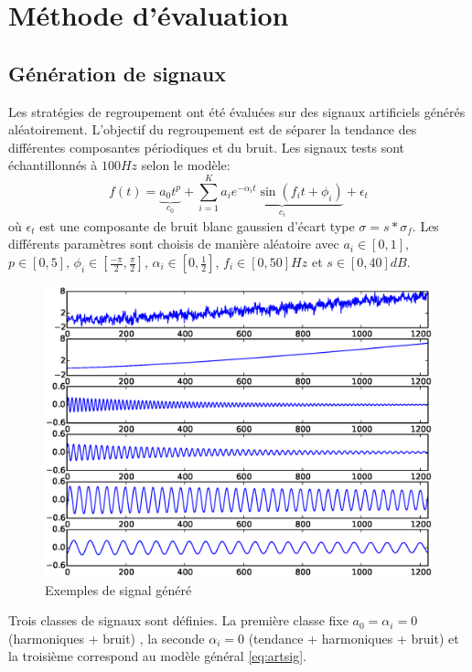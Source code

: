 \documentclass{gretsi}
\newcommand{\inter}{\left[0, 1\right]}
\begin{document}

\section{Méthode d'évaluation}
\label{sec:eval}

\subsection{Génération de signaux}
\label{sub:artsig}

    Les stratégies de regroupement ont été évaluées sur des signaux artificiels générés aléatoirement.
    L'objectif du regroupement est de séparer la tendance des différentes composantes périodiques et du bruit. Les signaux tests sont échantillonnés à $100Hz$ selon le modèle:
    \begin{equation}\label{eq:artsig}
    f(t) = \underbrace{a_0 t^p}_{c_0} + \sum_{i=1}^K \underbrace{a_i e^{-\alpha_i t} \sin\left(f_i t + \phi_i\right)}_{c_i} + \epsilon_t
    \end{equation}
    où $\epsilon_t$  est une composante de bruit blanc gaussien d'écart type $\sigma = s*\sigma_f$.
    Les différents paramètres sont choisis de manière aléatoire avec $a_i \in \inter$, $p \in \left[0, 5\right]$, $\displaystyle \phi_i \in\left[\frac{-\pi}{2}, \frac{\pi}{2}\right]$, $\alpha_i \in \left[0, \frac{1}{2}\right]$, $f_i \in \left[0, 50\right]Hz$ et $s \in \left[0, 40\right]dB$.
    
    \begin{figure}[htp]
        \hspace{-.5cm}
        \includegraphics[width=.5\textwidth]{img/artsig2.eps}
        \vspace{-.4cm}
        \caption{Exemples de signal généré }%
        \label{}
    \end{figure}

    Trois classes de signaux sont définies.
    La première classe fixe $a_0 = \alpha_i = 0$ (harmoniques + bruit) , la seconde $\alpha_i = 0$ (tendance + harmoniques + bruit) et la troisième correspond au modèle général \eqref{eq:artsig}.
\end{document}
